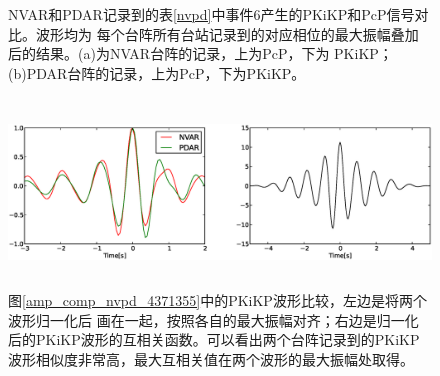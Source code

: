 \begin{figure}[!ht]
	\hfill{}
	\hfill{}
	\hfill{}
	\caption{NVAR和PDAR记录到的表\ref{nvpd}中事件6产生的PKiKP和PcP信号对比。波形均为%
每个台阵所有台站记录到的对应相位的最大振幅叠加后的结果。(a)为NVAR台阵的记录，上为PcP，下为%
PKiKP；(b)PDAR台阵的记录，上为PcP，下为PKiKP。}
	\label{amp_comp_nvpd_2872958}
\end{figure}

\begin{figure}[!ht]
	\centering
	\includegraphics[width=16cm,height=5cm]{fig/chap4/wf_cor.eps}
	\caption{图\ref{amp_comp_nvpd_4371355}中的PKiKP波形比较，左边是将两个波形归一化后%
画在一起，按照各自的最大振幅对齐；右边是归一化后的PKiKP波形的互相关函数。可以看出两个台阵记录到的PKiKP波形相似度非常高，最大互相关值在两个波形的最大振幅处取得。}
	\label{wf_cor}
\end{figure}

